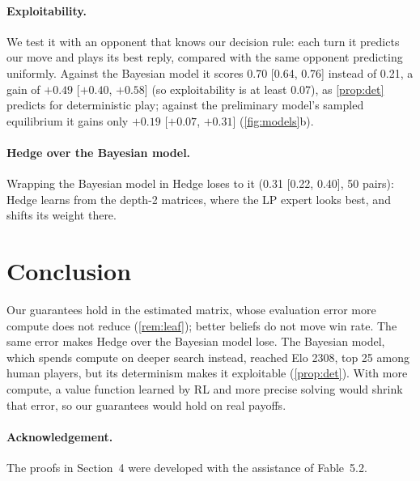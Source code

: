 \documentclass[10pt]{article}
\theoremstyle{tplain}
\theoremstyle{tdef}
\theoremstyle{trem}
\begin{document}
\paragraph{Exploitability.} We test it with an opponent that knows our decision rule: each turn it predicts our move and plays its best reply, compared with the same opponent predicting uniformly. Against the Bayesian model it scores 0.70 [0.64, 0.76] instead of 0.21, a gain of $+0.49$ [$+0.40$, $+0.58$] (so exploitability is at least 0.07), as \cref{prop:det} predicts for deterministic play; against the preliminary model's sampled equilibrium it gains only $+0.19$ [$+0.07$, $+0.31$] (\cref{fig:models}b).

\paragraph{Hedge over the Bayesian model.} Wrapping the Bayesian model in Hedge loses to it (0.31 [0.22, 0.40], 50 pairs): Hedge learns from the depth-2 matrices, where the LP expert looks best, and shifts its weight there.

\section{Conclusion}
\label{sec:discussion}
Our guarantees hold in the estimated matrix, whose evaluation error more compute does not reduce (\cref{rem:leaf}); better beliefs do not move win rate. The same error makes Hedge over the Bayesian model lose. The Bayesian model, which spends compute on deeper search instead, reached Elo 2308, top 25 among human players, but its determinism makes it exploitable (\cref{prop:det}). With more compute, a value function learned by RL and more precise solving would shrink that error, so our guarantees would hold on real payoffs.

\paragraph{Acknowledgement.} The proofs in Section~4 were developed with the assistance of Fable~5.2.
\end{document}
